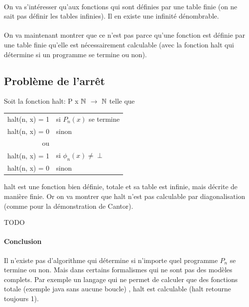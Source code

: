 \paragraph{} On va s'intéresser qu'aux fonctions qui sont définies par une table 
finie (on ne sait pas définir les tables infinies). Il en existe une infinité 
dénombrable.

\paragraph{} On va maintenant montrer que ce n'est pas parce qu’une fonction 
est définie par une table finie qu'elle est nécessairement calculable (avec la 
fonction halt qui détermine si un programme se termine ou non).


\subsection{Problème de l'arrêt}
\label{sub:probl_me_de_l_arr_t}

Soit la fonction halt: P x $\mathbb{N}$ $\rightarrow$ $\mathbb{N}$ telle que \\
\begin{tabular}{rl}
  halt(n, x) = 1 & si $P_n(x)$ se termine \\
  halt(n, x) = 0 & sinon \\
  ou &\\
  halt(n, x) = 1 & si $\phi_n(x)\neq \perp$ \\
  halt(n, x) = 0 & sinon \\
\end{tabular}

\begin{myprop}
	halt est une fonction bien définie, totale et sa table est infinie, mais décrite 
	de manière finie. Or on va montrer que halt n'est pas calculable par 
	diagonalisation (comme pour la démonstration de Cantor).\\
\end{myprop}

TODO \\

\paragraph{Conclusion} Il n'existe pas d'algorithme qui détermine si n'importe 
quel programme $P_n$ se termine ou non. Mais dans certains formalismes qui ne 
sont pas des modèles complets. Par exemple un langage qui ne permet de calculer 
que des fonctions totale (exemple java sans aucune boucle)
, halt est calculable (halt retourne toujours 1). \\

